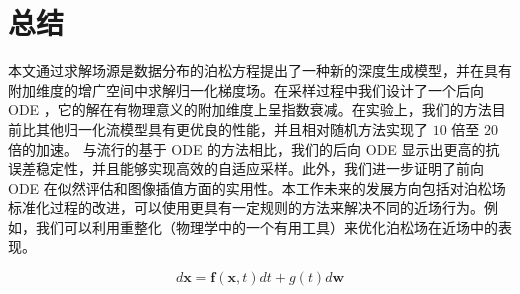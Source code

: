 \documentclass[hyperref,UTF-8]{ctexart}
\newcommand{\0}{\boldsymbol{0}}
\begin{document}
\section{总结}

本文通过求解场源是数据分布的泊松方程提出了一种新的深度生成模型，并在具有附加维度的增广空间中求解归一化梯度场。在采样过程中我们设计了一个后向 ODE ，它的解在有物理意义的附加维度上呈指数衰减。在实验上，我们的方法目前比其他归一化流模型具有更优良的性能，并且相对随机方法实现了 $10$ 倍至 $20$ 倍的加速。 与流行的基于 ODE 的方法相比，我们的后向 ODE 显示出更高的抗误差稳定性，并且能够实现高效的自适应采样。此外，我们进一步证明了前向 ODE 在似然评估和图像插值方面的实用性。本工作未来的发展方向包括对泊松场标准化过程的改进，可以使用更具有一定规则的方法来解决不同的近场行为。例如，我们可以利用重整化（物理学中的一个有用工具）来优化泊松场在近场中的表现。


\[
  d\mathbf{x} = \mathbf{f}(\mathbf{x},t)dt + g(t)d\mathbf{w}
\]
\end{document}
